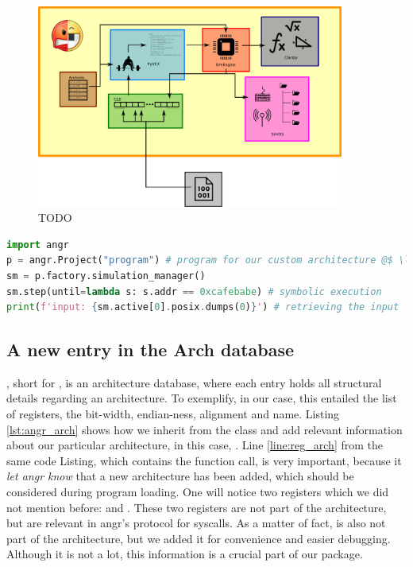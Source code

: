 \begin{figure}
    \centering
    \includegraphics[width=0.9\textwidth]{./images/angr.png}
    \caption{TODO}
    \label{fig:angr}
\end{figure}

\begin{lstlisting}[language=python, label={lst:angr_ex}, caption={A minimal angr code sample. We load a program into \cc{p}, create a simulation manager, symbolically execute the program until we reach the desired address \cc{0xcafebabe}, and finally print the input which determined this execution path.}]
import angr
p = angr.Project("program") # program for our custom architecture @$ \label{line:project} $@
sm = p.factory.simulation_manager()
sm.step(until=lambda s: s.addr == 0xcafebabe) # symbolic execution
print(f'input: {sm.active[0].posix.dumps(0)}') # retrieving the input
\end{lstlisting}

\subsection{A new entry in the Arch database}

, short for , is an architecture database, where each entry holds all structural details regarding an architecture. To exemplify, in our case, this entailed the list of registers, the bit-width, endian-ness, alignment and name. Listing \ref{lst:angr_arch} shows how we inherit from the  class and add relevant information about our particular architecture, in this case, . Line \ref{line:reg_arch} from the same code Listing, which contains the  function call, is very important, because it \emph{let angr know} that a new architecture has been added, which should be considered during program loading. One will notice two registers which we did not mention before:  and . These two registers are not part of the architecture, but are relevant in angr's protocol for \glspl{syscall}. As a matter of fact,  is also not part of the architecture, but we added it for convenience and easier debugging. Although it is not a lot, this information is a crucial part of our package.

